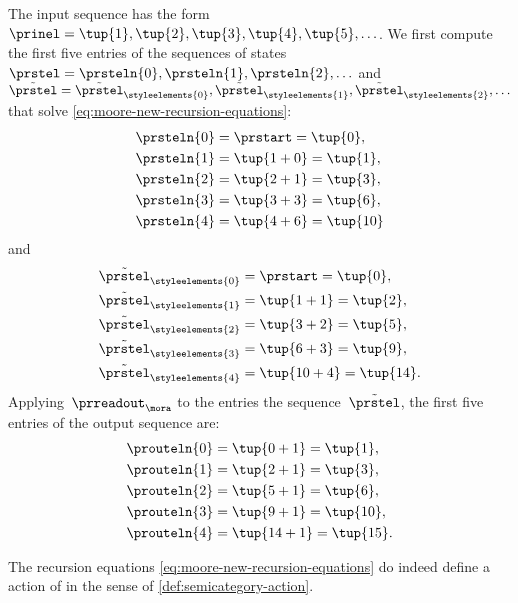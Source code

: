 \begin{example}
    The input sequence has the form~$\prinel = \tup{1}, \tup{2}, \tup{3}, \tup{4}, \tup{5}, \ldots$.
    We first compute the first five entries of the sequences of states~$\prstel = \prsteln{0}, \prsteln{1}, \prsteln{2}, \ldots$ and~$\tilde{\prstel} = \tilde{\prstel}_\styleelements{0}, \tilde{\prstel}_\styleelements{1}, \tilde{\prstel}_\styleelements{2}, \ldots$ that solve \cref{eq:moore-new-recursion-equations}:
    \begin{align}
        \prsteln{0} & = \prstart = \tup{0}, \\
        \prsteln{1} & = \tup{1 + 0} = \tup{1}, \\
        \prsteln{2} & = \tup{2 + 1} = \tup{3}, \\
        \prsteln{3} & = \tup{3 + 3} = \tup{6}, \\
        \prsteln{4} & = \tup{4 + 6} = \tup{10}
    \end{align}
    and
    \begin{align}
        \tilde{\prstel}_\styleelements{0} & = \prstart = \tup{0}, \\
        \tilde{\prstel}_\styleelements{1} & = \tup{1 + 1} = \tup{2}, \\
        \tilde{\prstel}_\styleelements{2} & = \tup{3 + 2} = \tup{5}, \\
        \tilde{\prstel}_\styleelements{3} & = \tup{6 + 3} = \tup{9}, \\
        \tilde{\prstel}_\styleelements{4} & = \tup{10 + 4} = \tup{14}.
    \end{align}
    Applying~$\prreadout_\mora$ to the entries the sequence~$\tilde \prstel$, the first five entries of the output sequence are:
    \begin{align}
        \prouteln{0} & = \tup{0 + 1} = \tup{1}, \\
        \prouteln{1} & = \tup{2 + 1} = \tup{3}, \\
        \prouteln{2} & = \tup{5 + 1} = \tup{6}, \\
        \prouteln{3} & = \tup{9 + 1} = \tup{10}, \\
        \prouteln{4} & = \tup{14 + 1} = \tup{15}.
    \end{align}
\end{example}


\begin{lemma}\label{lem:moore-new-recursion-equations}
    The recursion equations \cref{eq:moore-new-recursion-equations} do indeed define a  action of  in the sense of \cref{def:semicategory-action}.
\end{lemma}

